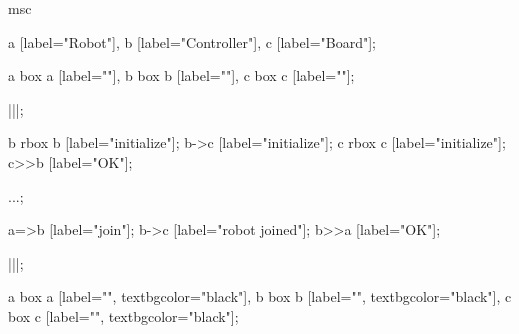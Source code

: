 \begin{msc}
msc
{

a [label="Robot"],
b [label="Controller"],
c [label="Board"];

a box a [label=""],
b box b [label=""],
c box c [label=""];

|||;

b rbox b [label="initialize"];
b->c [label="initialize"];
c rbox c [label="initialize"];
c>>b [label="OK"];

...;

a=>b [label="join"];
b->c [label="robot joined"];
b>>a [label="OK"];

|||;

a box a [label="", textbgcolor="black"],
b box b [label="", textbgcolor="black"],
c box c [label="", textbgcolor="black"];

}
\end{msc} 
